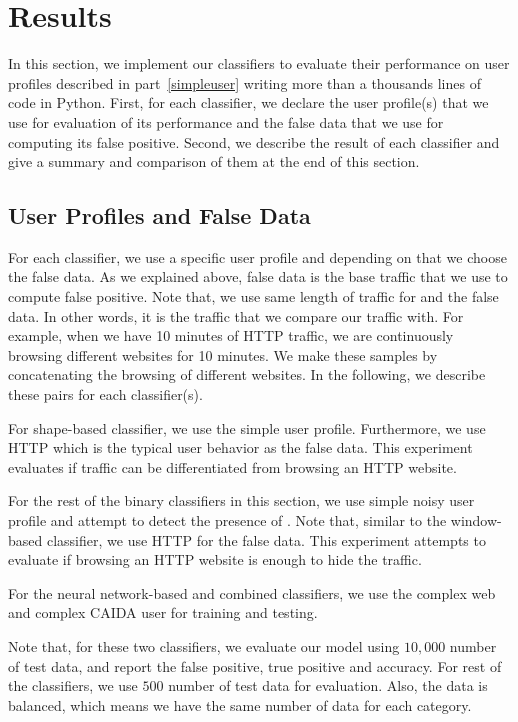 \vspace{-0.2mm}
\section{Results}\label{sec:exp}
In this section, we implement our classifiers to evaluate their performance on user profiles described in part~\ref{simpleuser} writing more than a thousands lines of code in Python. First, for each classifier, we declare the user profile(s) that we use for evaluation of its performance and the false data that we use for computing its false positive. Second, we describe the result of each classifier and give a summary and comparison of them at the end of this section. 

\subsection{User Profiles and False Data}

For each classifier, we use a specific user profile and depending on that we choose the false data. As we explained above, false data is the base traffic that we use to compute false positive. Note that, we use same length of traffic for \bc and the false data. In other words, it is the traffic that we compare our \bc traffic with. For example, when we have 10 minutes of HTTP traffic, we are continuously browsing different websites for 10 minutes. We make these samples by concatenating the browsing of different websites.
 In the following, we describe these pairs for each classifier(s). 
\begin{compactitem}

\item For shape-based classifier, we use the simple user profile. Furthermore, we use HTTP which is the typical user behavior as the false data. This experiment evaluates if \bc traffic can be differentiated from browsing an HTTP website. 
\item  For the rest of the binary classifiers in this section, we use simple noisy user profile and attempt to detect the presence of \bc. Note that, similar to the window-based classifier, we use HTTP for the false data. This experiment attempts to evaluate if browsing an HTTP website is enough to hide the \bc traffic. 
\item For the neural network-based and combined classifiers, we use the complex web and complex CAIDA user for training and testing.
\end{compactitem}
Note that, for these two classifiers, we evaluate our model using $10,000$ number of test data, and report the false positive, true positive and accuracy. For rest of the classifiers, we use $500$ number of test data for evaluation. Also, the data is balanced, which means we have the same number of data for each category.

